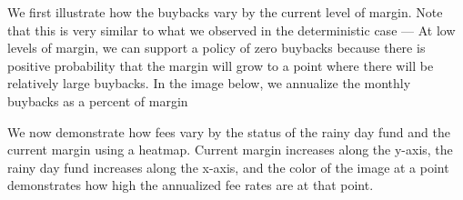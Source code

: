 We first illustrate how the buybacks vary by the current level of margin. Note that this is very
similar to what we observed in the deterministic case --- At low levels of margin, we can support
a policy of zero buybacks because there is positive probability that the margin will grow to a point
where there will be relatively large buybacks. In the image below, we annualize the monthly buybacks
as a percent of margin

\begin{center}
  \begin{figure}[H]
    \label{fig:sm_stochastic_buybacks}
  \end{figure}
\end{center}

We now demonstrate how fees vary by the status of the rainy day fund and the current margin using
a heatmap. Current margin increases along the y-axis, the rainy day fund increases along the x-axis,
and the color of the image at a point demonstrates how high the annualized fee rates are at that
point.

\begin{center}
  \begin{figure}[H]
    \label{fig:sm_annualized_taxrates}
  \end{figure}
\end{center}

